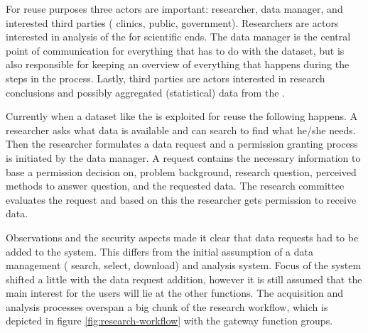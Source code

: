For reuse purposes three actors are important: researcher, data manager, and interested third parties (\eg{} clinics, public, government).
Researchers are actors interested in analysis of the \projectdata{} for scientific ends.
The data manager is the central point of communication for everything that has to do with the dataset, but is also responsible for keeping an overview of everything that happens during the steps in the process.
Lastly, third parties are actors interested in research conclusions and possibly aggregated (statistical) data from the \projectdata{}.

Currently when a dataset like the \projectdata{} is exploited for reuse the following happens.
A researcher asks what data is available and can search to find what he/she needs.
Then the researcher formulates a data request and a permission granting process is initiated by the data manager.
A request contains the necessary information to base a permission decision on, \eg{} problem background, research question, perceived methods to answer question, and the requested data.
The research committee evaluates the request and based on this the researcher gets permission to receive data.

Observations and the security aspects made it clear that data requests had to be added to the system.
This differs from the initial assumption of a data management (\eg{} search, select, download) and analysis system.
Focus of the system shifted a little with the data request addition, however it is still assumed that the main interest for the users will lie at the other functions.
The acquisition and analysis processes overspan a big chunk of the research workflow, which is depicted in figure \ref{fig:research-workflow} with the gateway function groups.